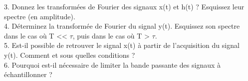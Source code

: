 	3. Donnez les transformées de Fourier des signaux x(t) et h(t) ? Esquissez leur spectre (en amplitude).\\
	
	4. Déterminez la transformée de Fourier du signal y(t). Esquissez son spectre dans le cas où T << $\tau$, puis dans le cas où T > $\tau$.\\
	
	5. Est-il possible de retrouver le signal x(t) à partir de l'acquisition du signal y(t). Comment et sous quelles conditions ?\\
	
	6. Pourquoi est-il nécessaire de limiter la bande passante des signaux à échantillonner ?
	